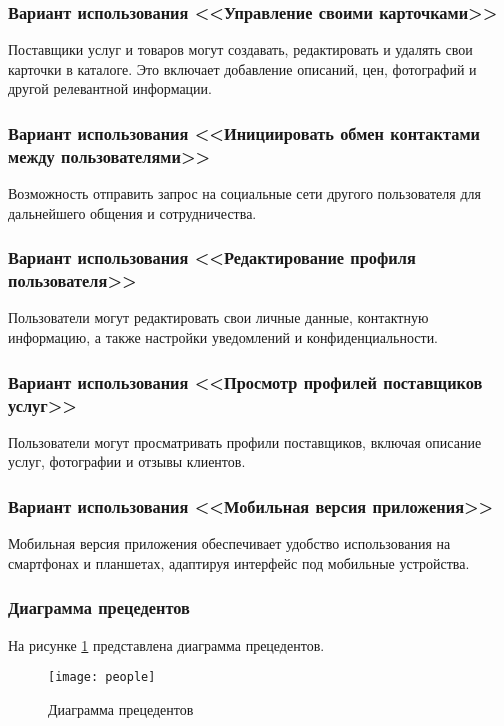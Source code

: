 \subsubsection{Вариант использования <<Управление своими карточками>>}
Поставщики услуг и товаров могут создавать, редактировать и удалять свои карточки в каталоге. Это включает добавление описаний, цен, фотографий и другой релевантной информации.

\subsubsection{Вариант использования <<Инициировать обмен контактами между пользователями>>} 
Возможность отправить запрос на социальные сети другого пользователя для дальнейшего общения и сотрудничества.

\subsubsection{Вариант использования <<Редактирование профиля пользователя>>}
Пользователи могут редактировать свои личные данные, контактную информацию, а также настройки уведомлений и конфиденциальности.

\subsubsection{Вариант использования <<Просмотр профилей поставщиков услуг>>}
Пользователи могут просматривать профили поставщиков, включая описание услуг, фотографии и отзывы клиентов.

\subsubsection{Вариант использования <<Мобильная версия приложения>>}
Мобильная версия приложения обеспечивает удобство использования на смартфонах и планшетах, адаптируя интерфейс под мобильные устройства.

\subsubsection{Диаграмма прецедентов}
На рисунке  \ref{people:image} представлена диаграмма прецедентов.

\begin{figure}[ht]
\centering
\texttt{[image: people]}
\caption{Диаграмма прецедентов}
\label{people:image}
\end{figure}

